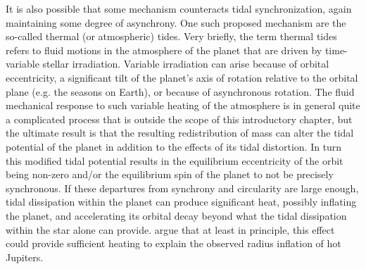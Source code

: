 It is also possible that some mechanism counteracts tidal synchronization, again
maintaining some degree of asynchrony.  One such proposed mechanism are the
so-called thermal (or atmospheric) tides.  Very briefly, the term thermal tides
refers to fluid motions in the atmosphere of the planet that are driven by
time-variable stellar irradiation. Variable irradiation can arise because of
orbital eccentricity, a significant tilt of the planet's axis of rotation
relative to the orbital plane (e.g. the seasons on Earth), or because of
asynchronous rotation.  The fluid mechanical response to such variable heating
of the atmosphere is in general quite a complicated process that is outside the
scope of this introductory chapter, but the ultimate result is that the
resulting redistribution of mass can alter the tidal potential of the planet in
addition to the effects of its tidal distortion. In turn this modified tidal
potential results in the equilibrium eccentricity of the orbit being non-zero
and/or the equilibrium spin of the planet to not be precisely synchronous. If
these departures from synchrony and circularity are large enough, tidal
dissipation within the planet can produce significant heat, possibly inflating
the planet, and accelerating its orbital decay beyond what the tidal dissipation
within the star alone can provide. \citet{Arras_Socrates_10} argue that at least
in principle, this effect could provide sufficient heating to explain the
observed radius inflation of hot Jupiters.
